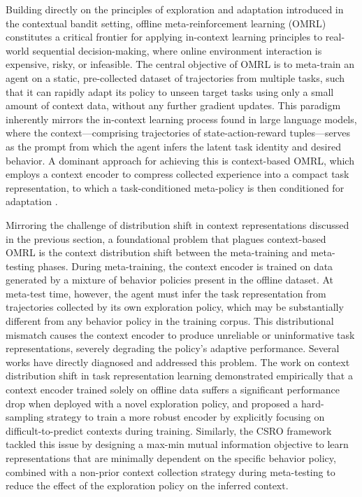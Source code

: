 \documentclass[11pt]{article}
\begin{document}
Building directly on the principles of exploration and adaptation introduced in the contextual bandit setting, offline meta-reinforcement learning (OMRL) constitutes a critical frontier for applying in-context learning principles to real-world sequential decision-making, where online environment interaction is expensive, risky, or infeasible. The central objective of OMRL is to meta-train an agent on a static, pre-collected dataset of trajectories from multiple tasks, such that it can rapidly adapt its policy to unseen target tasks using only a small amount of context data, without any further gradient updates. This paradigm inherently mirrors the in-context learning process found in large language models, where the context---comprising trajectories of state-action-reward tuples---serves as the prompt from which the agent infers the latent task identity and desired behavior. A dominant approach for achieving this is context-based OMRL, which employs a context encoder to compress collected experience into a compact task representation, to which a task-conditioned meta-policy is then conditioned for adaptation \cite{ref333}.

Mirroring the challenge of distribution shift in context representations discussed in the previous section, a foundational problem that plagues context-based OMRL is the context distribution shift between the meta-training and meta-testing phases. During meta-training, the context encoder is trained on data generated by a mixture of behavior policies present in the offline dataset. At meta-test time, however, the agent must infer the task representation from trajectories collected by its own exploration policy, which may be substantially different from any behavior policy in the training corpus. This distributional mismatch causes the context encoder to produce unreliable or uninformative task representations, severely degrading the policy's adaptive performance. Several works have directly diagnosed and addressed this problem. The work on context distribution shift in task representation learning \cite{ref334} demonstrated empirically that a context encoder trained solely on offline data suffers a significant performance drop when deployed with a novel exploration policy, and proposed a hard-sampling strategy to train a more robust encoder by explicitly focusing on difficult-to-predict contexts during training. Similarly, the CSRO framework \cite{ref335} tackled this issue by designing a max-min mutual information objective to learn representations that are minimally dependent on the specific behavior policy, combined with a non-prior context collection strategy during meta-testing to reduce the effect of the exploration policy on the inferred context.
\end{document}
